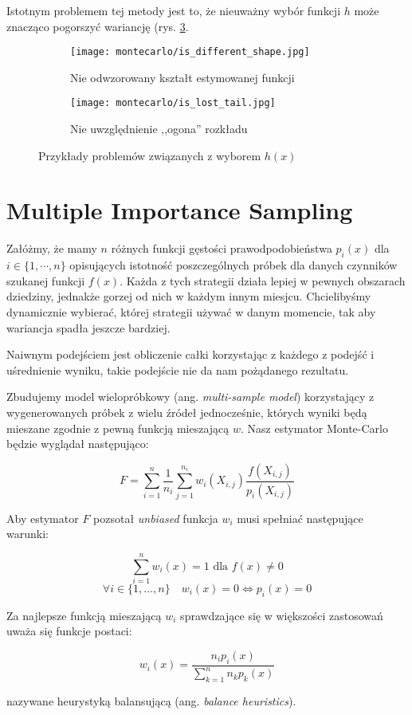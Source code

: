 \documentclass[../main.tex]{subfiles}
\begin{document}
Istotnym problemem tej metody jest to, że nieuważny wybór funkcji $h$ może
znacząco pogorszyć wariancję (rys. \ref{fig:ImportanceSamplingProblems}.

\begin{figure}
  \centering

  \begin{subfigure}[t]{0.45\textwidth}
    \texttt{[image: montecarlo/is\_different\_shape.jpg]}
    \label{fig:ImportanceSamplingWrongFunction}
    \caption{Nie odwzorowany kształt estymowanej funkcji}
  \end{subfigure}
  \begin{subfigure}[t]{0.45\textwidth}
    \centering
    \texttt{[image: montecarlo/is\_lost\_tail.jpg]}
    \label{fig:ImportanceSamplingLostTail}
    \caption{Nie uwzględnienie ,,ogona'' rozkładu}
  \end{subfigure}

  \label{fig:ImportanceSamplingProblems}
  \caption{Przykłady problemów związanych z wyborem $h(x)$}
\end{figure}

\section{Multiple Importance Sampling}


Załóżmy, że mamy $n$ różnych funkcji gęstości prawodpodobieństwa $p_{i}(x)$ dla
$i \in \{ 1, \cdots, n \}$ opisujących istotność poszczególnych próbek dla
danych czynników szukanej funkcji $f(x)$. Każda z tych strategii działa lepiej
w pewnych obszarach dziedziny, jednakże gorzej od nich w każdym innym miesjcu.
Chcielibyśmy dynamicznie wybierać, której strategii używać w danym momencie,
tak aby wariancja spadła jeszcze bardziej.

Naiwnym podejściem jest obliczenie całki korzystając z każdego z podejść
i uśrednienie wyniku, takie podejście nie da nam pożądanego rezultatu.

Zbudujemy model wielopróbkowy (ang. \textit{multi-sample model})
\cite{pbrt}\cite{ImportanceSamplingForProduction} korzystający z wygenerowanych
próbek z wielu źródeł jednocześnie, których wyniki będą mieszane zgodnie z
pewną funkcją mieszającą $w$. Nasz estymator Monte-Carlo będzie wyglądał
następująco:

\[
  F = \sum_{i=1}^{n} \frac{1}{n_i} \sum_{j=1}^{n_i} w_{i}(X_{i,j}) \frac{
    f(X_{i,j})
  }{
    p_{i}(X_{i,j})
  }
\]

Aby estymator $F$ pozsotał \textit{unbiased} funkcja $w_i$ musi spełniać
następujące warunki:

\[ \sum_{i = 1}^{n} w_{i}(x) = 1 \text{ dla } f(x) \neq 0 \]
\[
  \forall i \in \{ 1, \ldots, n \} \quad
  w_{i}(x) = 0 \Leftrightarrow p_i(x) = 0
\]

Za najlepsze funkcją mieszającą $w_i$ sprawdzające się w większości zastosowań
uważa się funkcje postaci:

\[
  w_{i}(x) = \frac{
    n_{i} p_{i}(x)
  }{
    \sum_{k=1}^{n} {
      n_{k} p_{k}(x)
    }
  }
\]

\noindent nazywane heurystyką balansującą (ang. \textit{balance heuristics}).
\end{document}
